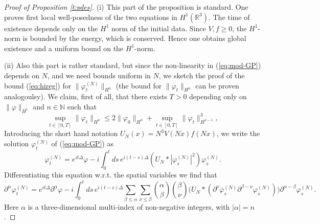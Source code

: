 \documentclass[11pt,a4paper,DIV11]{scrartcl}	%
\newcommand{\bR}{{\mathbb R}}
\newcommand{\bN}{{\mathbb N}}
\newcommand{\cE}{{\cal E}}
\newcommand{\ph}{\varphi_t^{(N)}}	%
\begin{document}
\begin{proof}[Proof of Proposition \ref{t:pdes}] 
(i) This part of the proposition is standard. One proves first local well-posedness of the two equations in $H^1 (\bR^3)$. The time of existence depends only on the $H^1$ norm of the initial data. Since $V,f \geq 0$, the $H^1$-norm is bounded by the energy, which is conserved.  
Hence one obtains global existence and a uniform bound on the $H^1$-norm. 

(ii) Also this part is rather standard, but since the non-linearity in (\ref{eq:mod-GP}) depends on $N$, and we need bounds uniform in $N$, we sketch the proof of the bound (\ref{eq:hireg}) for $\| \varphi_t^{(N)} \|_{H^n}$ (the bound for $\| \varphi_t \|_{H^n}$ can be proven analogoulsy). We claim, first of all, that there exists $T>0$ depending only on $\| \varphi \|_{H^1}$ and $n \in \bN$ such that
  \begin{equation}\label{eq:preregularity}
    \sup_{t \in [0,T]} \| \varphi_t \|_{H^n} \le 2 \| \varphi_0 \|_{H^n} +
    \sup_{t \in [0,T]} \| \varphi_t \|_{H^{n-1}}^3,
 \end{equation}
 Introducing the short hand notation $U_N (x)= N^3 V(Nx)f(Nx)$, we write the solution 
$\varphi_t^{(N)}$ of (\ref{eq:mod-GP}) as
\[
\varphi^{(N)}_t = e^{it\Delta} \varphi - i \int_0^t ds \, e^{i(t-s)\Delta} (U_N *
|\varphi^{(N)}_s|^2) \varphi^{(N)}_s.\]
Differentiating this equation w.r.t. the spatial variables we find that
\[
    \partial^\alpha \varphi^{(N)}_t = e^{it \Delta} \partial^\alpha \varphi - i
    \int_0^t ds \, e^{i(t-s) \Delta} \sum_{\beta \le \alpha} \sum_{\nu \le
    \beta} \binom{\alpha}{\beta} \binom{\beta}{\nu} \big( U_N * (\partial^\nu
    \overline{\varphi}^{(N)}_s \partial^{\beta - \nu} \varphi^{(N)}_s) \big)
    \partial^{\alpha - \beta} \varphi^{(N)}_s. \]
Here $\alpha$ is a three-dimensional multi-index of non-negative integers, with $|\alpha| = n$.
  

\end{proof}
\end{document}
